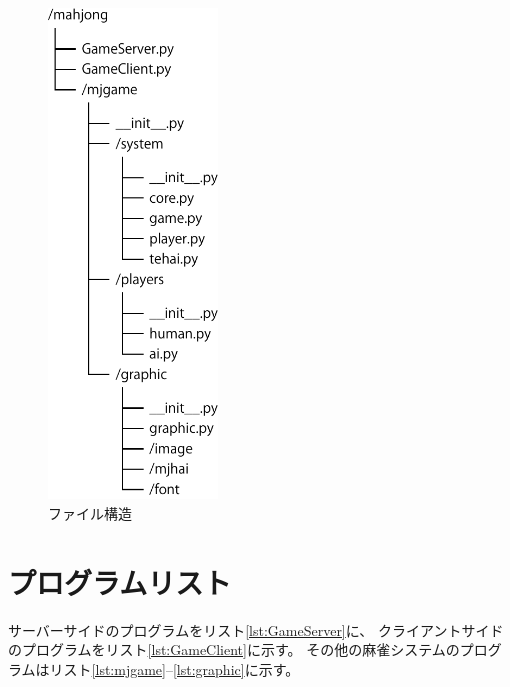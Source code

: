 \documentclass[a4j,titlepage]{jsarticle}
\begin{document}
\begin{figure}[H]
  \centering
  \includegraphics[height=13cm]{images/file.pdf}
  \caption{ファイル構造}
  \label{fig:file}
\end{figure}


\section{プログラムリスト}
サーバーサイドのプログラムをリスト\ref{lst:GameServer}に、
クライアントサイドのプログラムをリスト\ref{lst:GameClient}に示す。
その他の麻雀システムのプログラムはリスト\ref{lst:mjgame}--\ref{lst:graphic}に示す。










\end{document}
